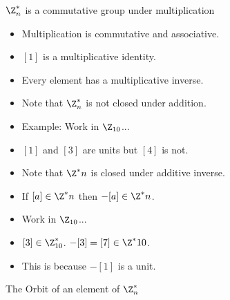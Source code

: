 \documentclass{beamer}
\begin{document}
\begin{frame}{$\Z^*_n$ is a commutative group under multiplication}

\begin{itemize}
  \item Multiplication is commutative and associative.
  \item $[1]$ is a multiplicative identity.
  \item Every element has a multiplicative inverse.
  \item Note that $\Z^*_n$ is not closed under addition.
  \item Example: Work in $\Z_{10}$...
  \item $[1]$ and $[3]$ are units but $[4]$ is not.
  \item Note that $\Z^*n$ is closed under additive inverse.
  \item If $[a]\in\Z^*n$ then $-[a]\in\Z^*n$.
  \item Work in $\Z_{10}$...
  \item $[3]\in\Z^*_{10}$. $-[3]=[7]\in\Z^*{10}$.
  \item This is because $-[1]$ is a unit.
\end{itemize}

\end{frame}


\begin{frame}{The Orbit of an element of $\Z_n^*$}


\end{frame}
\end{document}
